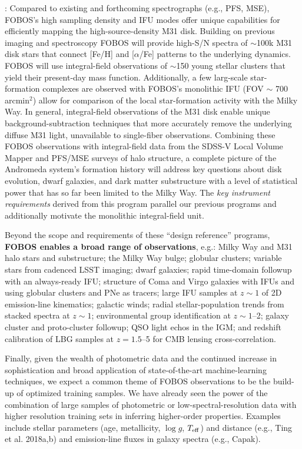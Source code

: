 \documentclass[oneside,11pt]{amsart}
\begin{document}
\smallskip

: Compared to
existing and forthcoming spectrographs (e.g., PFS, MSE), FOBOS's high
sampling density and IFU modes offer unique capabilities for
efficiently mapping the high-source-density M31 disk. Building on
previous imaging \citep[PHAT][]{phat} and spectroscopy
\citep[SPLASH][]{splash} FOBOS will provide high-S/N spectra of
$\sim$100k M31 disk stars that connect [Fe/H] and [$\alpha$/Fe]
patterns to the underlying dynamics. FOBOS will use integral-field
observations of $\sim$150 young stellar clusters that yield their
present-day mass function. Additionally, a few larg-scale
star-formation complexes are observed with FOBOS's monolithic IFU
(FOV $\sim$ 700 arcmin$^2$) allow for comparison of the local
star-formation activity with the Milky Way. In general,
integral-field observations of the M31 disk enable unique
background-subtraction techniques that more accurately remove the
underlying diffuse M31 light, unavailable to single-fiber
observations. Combining these FOBOS observations with integral-field
data from the SDSS-V Local Volume Mapper and PFS/MSE surveys of halo
structure, a complete picture of the Andromeda system's formation
history will address key questions about disk evolution, dwarf
galaxies, and dark matter substructure with a level of statistical
power that has so far been limited to the Milky Way. The {\it key
instrument requirements} derived from this program parallel our
previous programs and additionally motivate the monolithic
integral-field unit.

Beyond the scope and requirements of these ``design reference''
programs, {\bf FOBOS enables a broad range of observations}, e.g.:
Milky Way and M31 halo stars and substructure; the Milky Way bulge;
globular clusters; variable stars from cadenced LSST imaging; dwarf
galaxies; rapid time-domain followup with an always-ready IFU;
structure of Coma and Virgo galaxies with IFUs and using globular
clusters and PNe as tracers; large IFU samples at $z \sim 1$ of 2D
emission-line kinematics; galactic winds; radial stellar-population
trends from stacked spectra at $z \sim 1$; environmental group
identification at $z \sim 1$--2; galaxy cluster and proto-cluster
followup; QSO light echos in the IGM; and redshift calibration of LBG
samples at $z = 1.5$--5 for CMB lensing cross-correlation.

Finally, given the wealth of photometric data and the continued
increase in sophistication and broad application of state-of-the-art
machine-learning techniques, we expect a common theme of FOBOS
observations to be the build-up of optimized training samples. We
have already seen the power of the combination of large samples of
photometric or low-spectral-resolution data with higher resolution
training sets in inferring higher-order properties. Examples include
stellar parameters (age, metallicity, $\log g$, $T_{\rm eff}$) and
distance (e.g., Ting et al. 2018a,b) and emission-line fluxes in
galaxy spectra (e.g., Capak).
\end{document}
